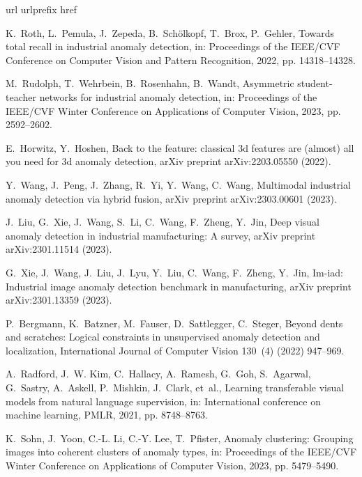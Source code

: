 \documentclass[final,5p,times,twocolumn]{elsarticle}
\begin{document}
\begin{thebibliography}{10}
\expandafter\ifx\csname url\endcsname\relax
  \def\url#1{\texttt{#1}}\fi
\expandafter\ifx\csname urlprefix\endcsname\relax\def\urlprefix{URL }\fi
\expandafter\ifx\csname href\endcsname\relax
  \def\href#1#2{#2} \def\path#1{#1}\fi

K.~Roth, L.~Pemula, J.~Zepeda, B.~Sch{\"o}lkopf, T.~Brox, P.~Gehler, Towards
  total recall in industrial anomaly detection, in: Proceedings of the IEEE/CVF
  Conference on Computer Vision and Pattern Recognition, 2022, pp.
  14318--14328.

M.~Rudolph, T.~Wehrbein, B.~Rosenhahn, B.~Wandt, Asymmetric student-teacher
  networks for industrial anomaly detection, in: Proceedings of the IEEE/CVF
  Winter Conference on Applications of Computer Vision, 2023, pp. 2592--2602.

E.~Horwitz, Y.~Hoshen, Back to the feature: classical 3d features are (almost)
  all you need for 3d anomaly detection, arXiv preprint arXiv:2203.05550
  (2022).

Y.~Wang, J.~Peng, J.~Zhang, R.~Yi, Y.~Wang, C.~Wang, Multimodal industrial
  anomaly detection via hybrid fusion, arXiv preprint arXiv:2303.00601 (2023).

J.~Liu, G.~Xie, J.~Wang, S.~Li, C.~Wang, F.~Zheng, Y.~Jin, Deep visual anomaly
  detection in industrial manufacturing: A survey, arXiv preprint
  arXiv:2301.11514 (2023).

G.~Xie, J.~Wang, J.~Liu, J.~Lyu, Y.~Liu, C.~Wang, F.~Zheng, Y.~Jin, Im-iad:
  Industrial image anomaly detection benchmark in manufacturing, arXiv preprint
  arXiv:2301.13359 (2023).

P.~Bergmann, K.~Batzner, M.~Fauser, D.~Sattlegger, C.~Steger, Beyond dents and
  scratches: Logical constraints in unsupervised anomaly detection and
  localization, International Journal of Computer Vision 130~(4) (2022)
  947--969.

A.~Radford, J.~W. Kim, C.~Hallacy, A.~Ramesh, G.~Goh, S.~Agarwal, G.~Sastry,
  A.~Askell, P.~Mishkin, J.~Clark, et~al., Learning transferable visual models
  from natural language supervision, in: International conference on machine
  learning, PMLR, 2021, pp. 8748--8763.

K.~Sohn, J.~Yoon, C.-L. Li, C.-Y. Lee, T.~Pfister, Anomaly clustering: Grouping
  images into coherent clusters of anomaly types, in: Proceedings of the
  IEEE/CVF Winter Conference on Applications of Computer Vision, 2023, pp.
  5479--5490.


\end{thebibliography}
\end{document}
